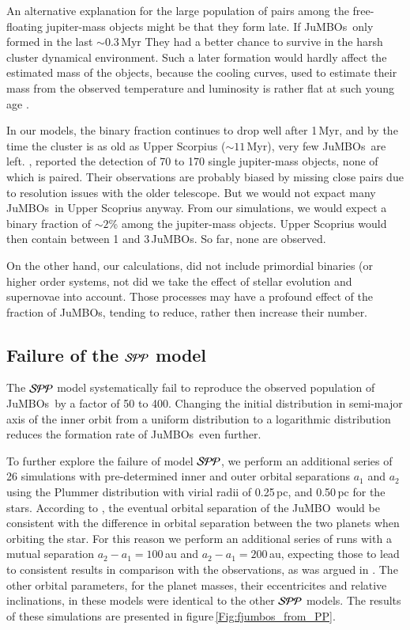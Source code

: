 \documentclass[submission,phys]{lib/SciPost}
\newcommand{\jumbo}{\mbox{JuMBO}}
\newcommand{\jumbos}{\mbox{JuMBOs}}
\begin{document}
An alternative explanation for the large population of pairs among the
free-floating jupiter-mass objects might be that they form late.  If
\jumbos\, only formed in the last $\sim 0.3$\,Myr They had a better
chance to survive in the harsh cluster dynamical environment.  Such a
later formation would hardly affect the estimated mass of the objects,
because the cooling curves, used to estimate their mass from the
observed temperature and luminosity is rather flat at such young age
\cite{2000MNRAS.314..858L}.

In our models, the binary fraction continues to drop well after
1\,Myr, and by the time the cluster is as old as Upper Scorpius ($\sim
11$\,Myr), very few \jumbos\, are left.  \cite{2022NatAs...6...89M},
reported the detection of 70 to 170 single jupiter-mass objects, none
of which is paired. Their observations are probably biased by missing
close pairs due to resolution issues with the older telescope.  But we
would not expact many \jumbos\, in Upper Scoprius anyway.  From our
simulations, we would expect a binary fraction of $\sim 2$\% among the
jupiter-mass objects. Upper Scoprius would then contain between 1 and
3\,\jumbos. So far, none are observed.

On the other hand, our calculations, did not include primordial
binaries (or higher order systems, not did we take the effect of
stellar evolution and supernovae into account. Those processes may
have a profound effect of the fraction of \jumbos, tending to reduce,
rather then increase their number.

\subsection{Failure of the ${\cal SPP}$ model}

The ${\cal SPP}$ model systematically fail to reproduce the observed
population of \jumbos\, by a factor of 50 to 400. Changing the initial
distribution in semi-major axis of the inner orbit from a uniform
distribution to a logarithmic distribution reduces the formation rate
of \jumbos\, even further.

To further explore the failure of model ${\cal SPP}$, we perform an
additional series of 26 simulations with pre-determined inner and
outer orbital separations $a_1$ and $a_2$ using the Plummer
distribution with virial radii of 0.25\,pc, and 0.50\,pc for the
stars.  According to \cite{2023arXiv231006016W}, the eventual orbital
separation of the \jumbo\, would be consistent with the difference in
orbital separation between the two planets when orbiting the star. For
this reason we perform an additional series of runs with a mutual
separation $a_2-a_1 = 100$\,au and $a_2-a_1 = 200$\,au, expecting
those to lead to consistent results in comparison with the
observations, as was argued in \cite{2023arXiv231006016W}.  The other
orbital parameters, for the planet masses, their eccentricites and
relative inclinations, in these models were identical to the other
${\cal SPP}$ models.  The results of these simulations are presented
in figure\,\ref{Fig:fjumbos_from_PP}.
\end{document}
